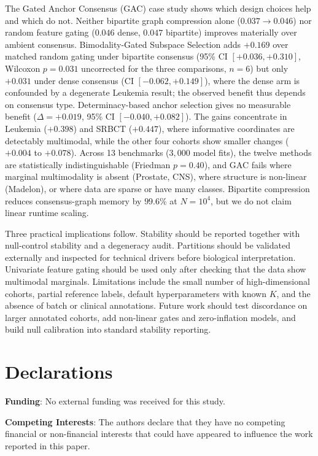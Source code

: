 \documentclass[pdflatex,sn-mathphys-num]{sn-jnl}
\theoremstyle{thmstyleone}
\theoremstyle{thmstyletwo}
\theoremstyle{thmstylethree}
\begin{document}
The Gated Anchor Consensus (GAC) case study shows which design choices help and which do not. Neither bipartite graph compression alone ($0.037 \to 0.046$) nor random feature gating ($0.046$ dense, $0.047$ bipartite) improves materially over ambient consensus. Bimodality-Gated Subspace Selection adds $+0.169$ over matched random gating under bipartite consensus (95\% CI $[+0.036, +0.310]$, Wilcoxon $p = 0.031$ uncorrected for the three comparisons, $n = 6$) but only $+0.031$ under dense consensus (CI $[-0.062, +0.149]$), where the dense arm is confounded by a degenerate Leukemia result; the observed benefit thus depends on consensus type. Determinacy-based anchor selection gives no measurable benefit ($\Delta = +0.019$, 95\% CI $[-0.040, +0.082]$). The gains concentrate in Leukemia ($+0.398$) and SRBCT ($+0.447$), where informative coordinates are detectably multimodal, while the other four cohorts show smaller changes ($+0.004$ to $+0.078$). Across 13 benchmarks ($3{,}000$ model fits), the twelve methods are statistically indistinguishable (Friedman $p = 0.40$), and GAC fails where marginal multimodality is absent (Prostate, CNS), where structure is non-linear (Madelon), or where data are sparse or have many classes. Bipartite compression reduces consensus-graph memory by $99.6\%$ at $N = 10^4$, but we do not claim linear runtime scaling.

Three practical implications follow. Stability should be reported together with null-control stability and a degeneracy audit. Partitions should be validated externally and inspected for technical drivers before biological interpretation. Univariate feature gating should be used only after checking that the data show multimodal marginals. Limitations include the small number of high-dimensional cohorts, partial reference labels, default hyperparameters with known $K$, and the absence of batch or clinical annotations. Future work should test discordance on larger annotated cohorts, add non-linear gates and zero-inflation models, and build null calibration into standard stability reporting.

\backmatter

\section*{Declarations}

\textbf{Funding}: No external funding was received for this study.

\textbf{Competing Interests}: The authors declare that they have no competing financial or non-financial interests that could have appeared to influence the work reported in this paper.
\end{document}
